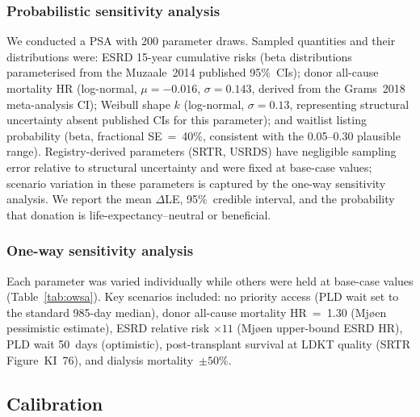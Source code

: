 \subsubsection*{Probabilistic sensitivity analysis}

We conducted a PSA with 200 parameter draws.
Sampled quantities and their distributions were:
ESRD 15-year cumulative risks (beta distributions parameterised from the
Muzaale~2014 published 95\%~CIs);
donor all-cause mortality HR (log-normal, $\mu = {-0.016}$,
$\sigma = 0.143$, derived from the Grams~2018 meta-analysis CI);
Weibull shape $k$ (log-normal, $\sigma = 0.13$, representing structural
uncertainty absent published CIs for this parameter); and
waitlist listing probability (beta, fractional SE~=~40\%, consistent with
the 0.05--0.30 plausible range).
Registry-derived parameters (SRTR, USRDS) have negligible sampling error
relative to structural uncertainty and were fixed at base-case values;
scenario variation in these parameters is captured by the one-way
sensitivity analysis.
We report the mean $\Delta$LE, 95\%~credible interval, and the
probability that donation is life-expectancy--neutral or beneficial.

\subsubsection*{One-way sensitivity analysis}

Each parameter was varied individually while others were held at
base-case values (Table~\ref{tab:owsa}).
Key scenarios included: no priority access (PLD wait set to the
standard 985-day median), donor all-cause mortality HR~=~1.30
(Mjøen pessimistic estimate), ESRD relative risk
$\times 11$ (Mjøen upper-bound ESRD HR), PLD wait 50~days (optimistic),
post-transplant survival at LDKT quality (SRTR Figure~KI~76), and
dialysis mortality~$\pm 50\%$.

\subsection{Calibration}

